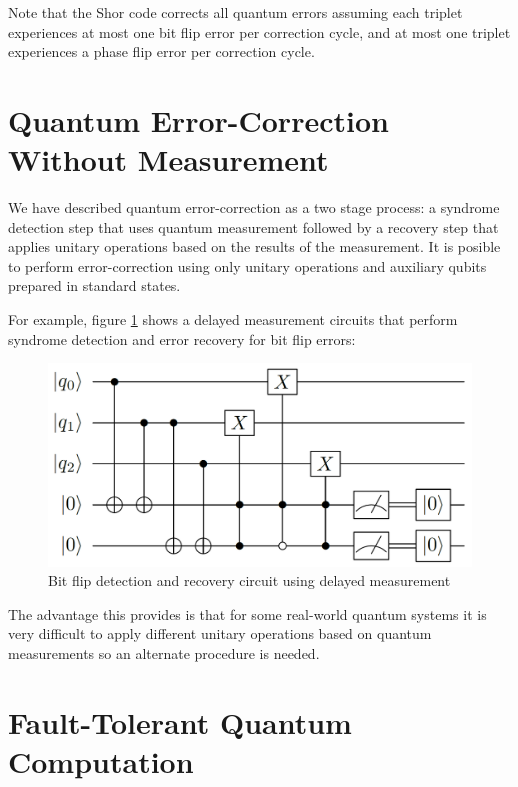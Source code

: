 Note that the Shor code corrects all quantum errors assuming each triplet experiences at most one bit flip error per correction cycle, and at most one triplet experiences a phase flip error per correction cycle.

\section{Quantum Error-Correction Without Measurement}

We have described quantum error-correction as a two stage process: a syndrome detection step that uses quantum measurement followed by a recovery step that applies unitary operations based on the results of the measurement. It is posible to perform error-correction using only unitary operations and auxiliary qubits prepared in standard states.

For example, figure \ref{fig:BitFlipDetectionAndRecoveryCircuitDelayedMeasurement} shows a delayed measurement circuits that perform syndrome detection and error recovery for bit flip errors:

\begin{figure}[h!]
    \centering
    \includegraphics[scale=.25]{images/ErrorCorrection-BitFlipDetectionAndRecoveryCircuitDelayedMeasurement.png}
    \caption{Bit flip detection and recovery circuit using delayed measurement \cite{ThomasWong_2022}}
    \label{fig:BitFlipDetectionAndRecoveryCircuitDelayedMeasurement}
\end{figure}

The advantage this provides is that for some real-world quantum systems it is very difficult to apply different unitary operations based on quantum measurements so an alternate procedure is needed.

\section{Fault-Tolerant Quantum Computation}


